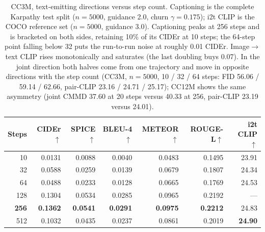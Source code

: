 \begin{table}[tb]
\centering
\footnotesize
\begin{tabular}{rrrrrrr}
\toprule
Steps & \textbf{CIDEr}$\uparrow$ & SPICE$\uparrow$ & BLEU-4$\uparrow$ & METEOR$\uparrow$ & ROUGE-L$\uparrow$ & i2t CLIP$\uparrow$ \\
\midrule
10 & 0.0131 & 0.0088 & 0.0040 & 0.0483 & 0.1495 & 23.91 \\
32 & 0.0588 & 0.0259 & 0.0139 & 0.0679 & 0.1807 & 24.34 \\
64 & 0.0488 & 0.0233 & 0.0128 & 0.0665 & 0.1769 & 24.53 \\
128 & 0.1304 & 0.0534 & 0.0285 & 0.0965 & 0.2192 & --- \\
\textbf{256} & \textbf{0.1362} & \textbf{0.0541} & \textbf{0.0291} & \textbf{0.0975} & \textbf{0.2212} & 24.83 \\
512 & 0.1032 & 0.0435 & 0.0237 & 0.0861 & 0.2019 & \textbf{24.90} \\
\bottomrule
\end{tabular}
\caption{CC3M, text-emitting directions versus step count. Captioning is the complete Karpathy
test split ($n{=}5000$, guidance 2.0, churn $\gamma{=}0.175$); i2t CLIP is the COCO reference set
($n{=}5000$, guidance 3.0). Captioning peaks at 256 steps and is bracketed on both sides,
retaining 10\% of its CIDEr at 10 steps; the 64-step point falling below 32 puts the run-to-run
noise at roughly 0.01 CIDEr. Image$\rightarrow$text CLIP rises monotonically and saturates (the
last doubling buys 0.07). In the joint direction both halves come from one trajectory and move in
opposite directions with the step count (CC3M, $n{=}5000$, 10 / 32 / 64 steps: FID 56.06 / 59.14
/ 62.66, pair-CLIP 23.16 / 24.71 / 25.17); CC12M shows the same asymmetry (joint CMMD 37.60 at
20 steps versus 40.33 at 256, pair-CLIP 23.19 versus 24.01).}
\label{tab:app:image:text-steps}
\end{table}

